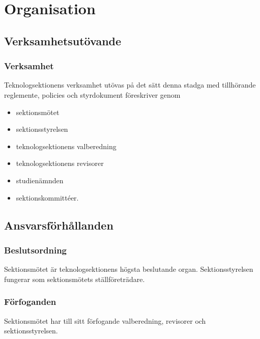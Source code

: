 \section{Organisation}

\subsection{Verksamhetsutövande}

\subsubsection{Verksamhet}
Teknologsektionens verksamhet utövas på det sätt denna stadga med tillhörande reglemente, policies och styrdokument föreskriver genom

\begin{itemize}
	\item sektionsmötet
	\item sektionsstyrelsen \STYRIT{}
	\item teknologsektionens valberedning
	\item teknologsektionens revisorer
	\item studienämnden \SNIT{}
	\item sektionskommittéer.
\end{itemize}

\subsection{Ansvarsförhållanden}

\subsubsection{Beslutsordning}
Sektionsmötet är teknologsektionens högsta beslutande organ. Sektionsstyrelsen fungerar som sektionsmötets ställföreträdare.

\subsubsection{Förfoganden}
Sektionsmötet har till sitt förfogande valberedning, revisorer och sektionsstyrelsen.


